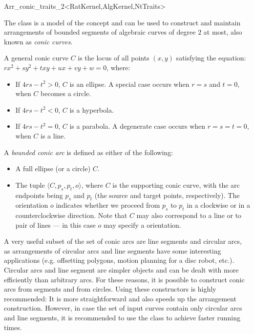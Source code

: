 
\ccRefPageBegin
\begin{ccRefClass}{Arr_conic_traits_2<RatKernel,AlgKernel,NtTraits>}

\ccDefinition

The class \ccRefName{} is a model of the  concept
and can be used to construct and maintain arrangements of bounded segments of
algebraic curves of degree $2$ at most, also known as {\sl conic curves}.

A general conic curve $C$ is the locus of all points $(x,y)$ satisfying the
equation: $r x^2 + s y^2 + t x y + u x + v y + w = 0$, where: 
\begin{itemize}
\item If $4 r s - t^2 > 0$, $C$ is an ellipse.
      A special case occurs when $r = s$ and $t = 0$, when $C$
      becomes a circle. 
\item If $4 r s - t^2 < 0$, $C$ is a hyperbola. 
\item If $4 r s - t^2 = 0$, $C$ is a parabola.
      A degenerate case occurs when $r = s = t = 0$, when $C$ is a line.
\end{itemize}

A {\sl bounded conic arc} is defined as either of the following: 
\begin{itemize}
\item A full ellipse (or a circle) $C$. 
\item The tuple $\langle C, p_s, p_t, o \rangle$, where $C$ is the supporting
      conic curve, with the arc endpoints being $p_s$ and $p_t$ 
      (the source and target points, respectively). The orientation $o$  
      indicates whether we proceed from $p_s$ to $p_t$ in a clockwise or in a
      counterclockwise direction. Note that $C$ may also
      correspond to a line or to pair of lines --- in this case $o$ may
      specify a  orientation.
\end{itemize}

A very useful subset of the set of conic arcs are line segments and circular
arcs, as arrangements of circular arcs and line segments have some
interesting applications (e.g. offsetting polygons, motion planning for a
disc robot, etc.). Circular arcs and line segment are simpler objects and can
be dealt with more efficiently than arbitrary arcs. For these reasons, it is
possible to construct conic arcs from segments and from circles. Using these
constructors is highly recommended: It is more straightforward and also speeds 
up the arrangement  construction. However, in case the set of input curves
contain only circular arcs and line segments, it is recommended to use the
 class to achieve faster running times.


\end{ccRefClass}
